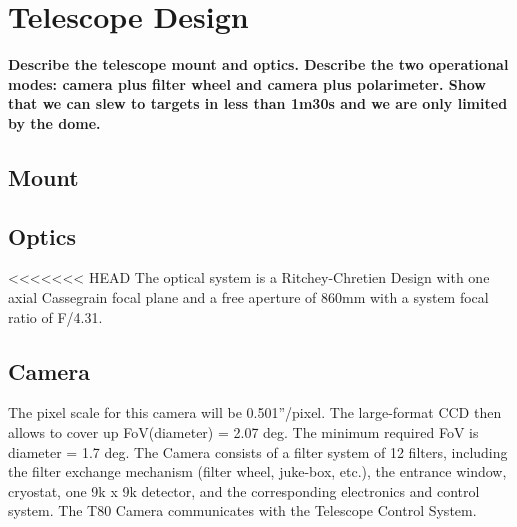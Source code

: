 \documentclass[12pt,preprint]{aastex}
\begin{document}
\section{Telescope Design}
{\bf \color{red} Describe the telescope mount and optics. Describe the two operational modes: camera plus filter wheel and camera plus polarimeter. Show that we can slew to targets in less than 1m30s and we are only limited by the dome.}

\subsection{Mount}

\subsection{Optics}
<<<<<<< HEAD
The optical system is a Ritchey-Chretien Design with one axial Cassegrain focal plane and a free aperture of 860mm with a system focal ratio of F/4.31.


\subsection{Camera}

The pixel scale for this camera will be 0.501''/pixel. The large-format CCD then allows to cover up FoV(diameter) = 2.07 deg. The minimum required FoV is diameter = 1.7 deg. The Camera consists of a filter system of 12 filters, including the filter exchange mechanism (filter wheel, juke-box, etc.), the entrance window, cryostat, one 9k x 9k detector, and the corresponding electronics and control system. The T80 Camera communicates with the Telescope Control System.
\end{document}
